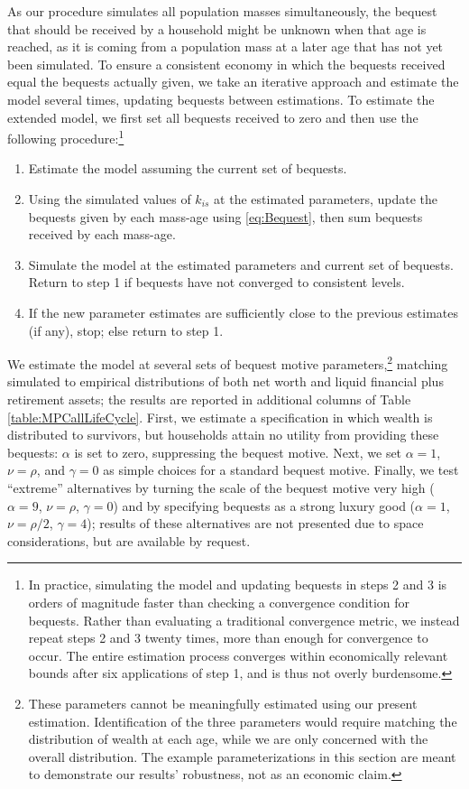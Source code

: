 \documentclass{econtex}\usepackage[pdftex]{graphicx}\usepackage{epstopdf} \usepackage[pdftex]{hyperref}
\newcommand{\kRat}{\ensuremath{k}}
\begin{document}
As our procedure simulates all population masses simultaneously, the bequest that should be received by a household might be unknown when that age is reached, as it is coming from a population mass at a later age that has not yet been simulated.  To ensure a consistent economy in which the bequests received equal the bequests actually given, we take an iterative approach and estimate the model several times, updating bequests between estimations.  To estimate the extended model, we first set all bequests received to zero and then use the following procedure:\footnote{In practice, simulating the model and updating bequests in steps 2 and 3 is orders of magnitude faster than checking a convergence condition for bequests.  Rather than evaluating a traditional convergence metric, we instead repeat steps 2 and 3 twenty times, more than enough for convergence to occur.  The entire estimation process converges within economically relevant bounds after six applications of step 1, and is thus not overly burdensome.}
\begin{enumerate}
\item Estimate the model assuming the current set of bequests.

\item Using the simulated values of $\kRat_{is}$ at the estimated parameters, update the bequests given by each mass-age using \eqref{eq:Bequest}, then sum bequests received by each mass-age.

\item Simulate the model at the estimated parameters and current set of bequests. Return to step 1 if bequests have not converged to consistent levels.

\item If the new parameter estimates are sufficiently close to the previous estimates (if any), stop; else return to step 1.
\end{enumerate}

We estimate the model at several sets of bequest motive parameters,\footnote{These parameters cannot be meaningfully estimated using our present estimation.  Identification of the three parameters would require matching the distribution of wealth at each age, while we are only concerned with the overall distribution.  The example parameterizations in this section are meant to demonstrate our results' robustness, not as an economic claim.} matching simulated to empirical distributions of both net worth and liquid financial plus retirement assets; the results are reported in additional columns of Table \ref{table:MPCallLifeCycle}.  First, we estimate a specification in which wealth is distributed to survivors, but households attain no utility from providing these bequests: $\alpha$ is set to zero, suppressing the
bequest motive.  Next, we set $\alpha = 1$, $\nu = \rho$, and $\gamma = 0$ as simple choices for a standard bequest motive.  Finally, we test ``extreme'' alternatives by turning the scale of the bequest motive very high ($\alpha = 9$, $\nu = \rho$, $\gamma = 0$) and by specifying bequests as a strong luxury good ($\alpha = 1$, $\nu = \rho/2$, $\gamma = 4$); results of these alternatives are not presented due to space considerations, but are available by request.
\end{document}
